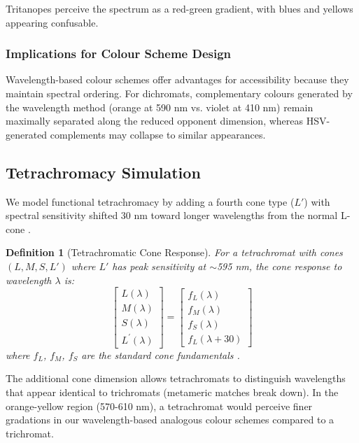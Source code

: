 \documentclass[12pt,a4paper]{article}
\newtheorem{definition}[theorem]{Definition}
\newcommand{\wavelength}{\lambda}
\begin{document}
Tritanopes perceive the spectrum as a red-green gradient, with blues and yellows appearing confusable.

\subsubsection{Implications for Colour Scheme Design}

Wavelength-based colour schemes offer advantages for accessibility because they maintain spectral ordering. For dichromats, complementary colours generated by the wavelength method (orange at 590 nm vs. violet at 410 nm) remain maximally separated along the reduced opponent dimension, whereas HSV-generated complements may collapse to similar appearances.

\subsection{Tetrachromacy Simulation}

We model functional tetrachromacy by adding a fourth cone type ($L'$) with spectral sensitivity shifted 30 nm toward longer wavelengths from the normal L-cone \cite{jordan2010neural}.

\begin{definition}[Tetrachromatic Cone Response]
For a tetrachromat with cones $(L, M, S, L')$ where $L'$ has peak sensitivity at $\sim$595 nm, the cone response to wavelength $\wavelength$ is:
\begin{equation}
\begin{bmatrix} L(\wavelength) \\ M(\wavelength) \\ S(\wavelength) \\ L^\prime(\wavelength) \end{bmatrix} = 
\begin{bmatrix}
f_L(\wavelength) \\
f_M(\wavelength) \\
f_S(\wavelength) \\
f_L(\wavelength + 30)
\end{bmatrix}
\end{equation}
where $f_L$, $f_M$, $f_S$ are the standard cone fundamentals \cite{stockman2000spectral}.
\end{definition}

The additional cone dimension allows tetrachromats to distinguish wavelengths that appear identical to trichromats (metameric matches break down). In the orange-yellow region (570-610 nm), a tetrachromat would perceive finer gradations in our wavelength-based analogous colour schemes compared to a trichromat.
\end{document}
